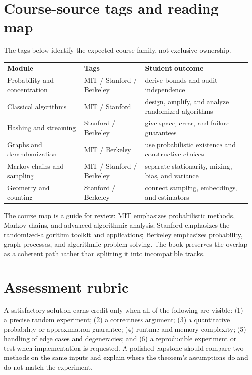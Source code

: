 \section{Course-source tags and reading map}

The tags below identify the expected course family, not exclusive ownership.
\begin{center}
\begin{tabular}{p{}p{}p{}}
\textbf{Module} & \textbf{Tags} & \textbf{Student outcome}\\
Probability and concentration & MIT / Stanford / Berkeley & derive bounds and audit independence\\
Classical algorithms & MIT / Stanford & design, amplify, and analyze randomized algorithms\\
Hashing and streaming & Stanford / Berkeley & give space, error, and failure guarantees\\
Graphs and derandomization & MIT / Berkeley & use probabilistic existence and constructive choices\\
Markov chains and sampling & MIT / Stanford / Berkeley & separate stationarity, mixing, bias, and variance\\
Geometry and counting & Stanford / Berkeley & connect sampling, embeddings, and estimators\\
\end{tabular}
\end{center}
The course map is a guide for review: MIT emphasizes probabilistic methods,
Markov chains, and advanced algorithmic analysis; Stanford emphasizes the
randomized-algorithm toolkit and applications; Berkeley emphasizes probability,
graph processes, and algorithmic problem solving.  The book preserves the
overlap as a coherent path rather than splitting it into incompatible tracks.

\section{Assessment rubric}

A satisfactory solution earns credit only when all of the following are
visible: (1) a precise random experiment; (2) a correctness argument; (3) a
quantitative probability or approximation guarantee; (4) runtime and memory
complexity; (5) handling of edge cases and degeneracies; and (6) a reproducible
experiment or test when implementation is requested.  A polished capstone
should compare two methods on the same inputs and explain where the theorem's
assumptions do and do not match the experiment.

